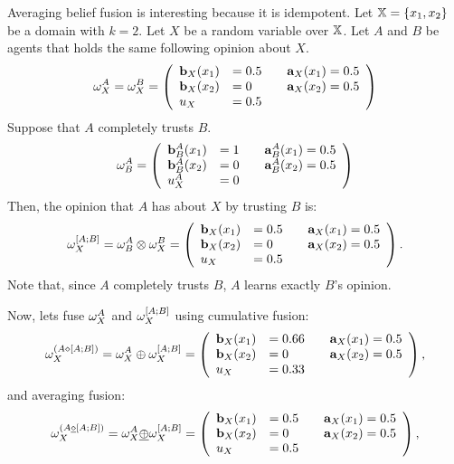 \documentclass[a4paper,12pt]{article}
\theoremstyle{definition}
\theoremstyle{theorem}
\numberwithin{equation}{section}
\begin{document}
Averaging belief fusion is interesting because it is idempotent. Let $\mathbb{X} = \{x_1, x_2\}$ be a domain with $k = 2$. Let $X$ be a random variable over $\mathbb{X}$. Let $A$ and $B$ be agents that holds the same following opinion about $X$.
\begin{equation}
\omega^{A}_{X} = \omega^{B}_{X} =
\left(
\begin{array}{llll}
\mathbf{b}_{X}(x_1) & = 0.5 & & \mathbf{a}_{X}(x_1) = 0.5 \\
\mathbf{b}_{X}(x_2) & = 0 & & \mathbf{a}_{X}(x_2) = 0.5 \\
u_X & = 0.5
\end{array}
\right)
\end{equation}
Suppose that $A$ completely trusts $B$.
\begin{equation}
\omega^{A}_{B} =
\left(
\begin{array}{llll}
\mathbf{b}^{A}_{B}(x_1) & = 1 & & \mathbf{a}^{A}_{B}(x_1) = 0.5 \\
\mathbf{b}^{A}_{B}(x_2) & = 0 & & \mathbf{a}^{A}_{B}(x_2) = 0.5 \\
u^A_X & = 0
\end{array}
\right)
\end{equation}
Then, the opinion that $A$ has about $X$ by trusting $B$ is:
\begin{equation}
\omega^{[A;B]}_{X} = \omega^{A}_{B} \otimes \omega^{B}_{X} =
\left(
\begin{array}{llll}
\mathbf{b}_{X}(x_1) & = 0.5 & & \mathbf{a}_{X}(x_1) = 0.5 \\
\mathbf{b}_{X}(x_2) & = 0 & & \mathbf{a}_{X}(x_2) = 0.5 \\
u_X & = 0.5
\end{array}
\right) \text{.}
\end{equation}
Note that, since $A$ completely trusts $B$, $A$ learns exactly $B$'s opinion.

Now, lets fuse $\omega^{A}_{X}$ and $\omega^{[A;B]}_{X}$ using cumulative fusion:
\begin{equation}
\omega^{(A \diamond [A; B])}_{X} = \omega^{A}_{X} \oplus \omega^{[A;B]}_{X} =\left(
\begin{array}{llll}
\mathbf{b}_{X}(x_1) & = 0.66 & & \mathbf{a}_{X}(x_1) = 0.5 \\
\mathbf{b}_{X}(x_2) & = 0 & & \mathbf{a}_{X}(x_2) = 0.5 \\
u_X & = 0.33
\end{array}
\right) \text{,}
\end{equation}
and averaging fusion:
\begin{equation}
\omega^{(A \underline{\diamond} [A; B])}_{X} = \omega^{A}_{X} \underline{\oplus} \omega^{[A;B]}_{X} =\left(
\begin{array}{llll}
\mathbf{b}_{X}(x_1) & = 0.5 & & \mathbf{a}_{X}(x_1) = 0.5 \\
\mathbf{b}_{X}(x_2) & = 0 & & \mathbf{a}_{X}(x_2) = 0.5 \\
u_X & = 0.5
\end{array}
\right) \text{,}
\end{equation}
\end{document}
